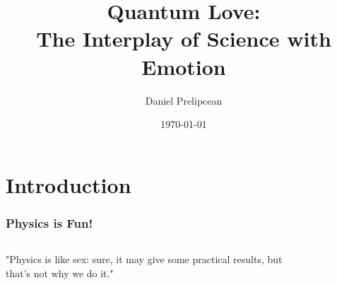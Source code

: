 \documentclass{beamer}
\title[Quantum Love]{Quantum Love: \\ The Interplay of Science with Emotion} %
\author{Daniel Prelipcean} %
\institute[JUB Stem Slam 2018] %
{Jacobs University Bremen
 \\ %
\medskip
\textit{d.prelipcean@jacobs-university.de} %
}
\date{\today} %
\newcommand{\nl}{\\ \vspace{1em}}
\begin{document}
\begin{frame}
\titlepage %


\end{frame}




\section{Introduction} %





\begin{frame}


\frametitle{Physics is Fun!}
\begin{columns}
"Physics is like sex: sure, it may give some practical results, but that's not why we do it."
\nl
{}

\begin{figure}
\end{figure}
\end{columns}



    
\end{frame}
\end{document}
